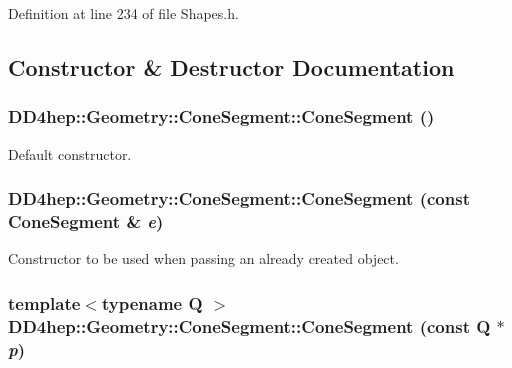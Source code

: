 Definition at line 234 of file Shapes.h.

\subsection{Constructor \& Destructor Documentation}
\hypertarget{class_d_d4hep_1_1_geometry_1_1_cone_segment_a066f3dc238069de0c9bd9d914218229a}{
\subsubsection[{ConeSegment}]{\setlength{\rightskip}{0pt plus 5cm}DD4hep::Geometry::ConeSegment::ConeSegment ()}}
\label{class_d_d4hep_1_1_geometry_1_1_cone_segment_a066f3dc238069de0c9bd9d914218229a}


Default constructor. \hypertarget{class_d_d4hep_1_1_geometry_1_1_cone_segment_a4b394ee203efc33e4ae6fa85bee189c3}{
\subsubsection[{ConeSegment}]{\setlength{\rightskip}{0pt plus 5cm}DD4hep::Geometry::ConeSegment::ConeSegment (const {\bf ConeSegment} \& {\em e})}}
\label{class_d_d4hep_1_1_geometry_1_1_cone_segment_a4b394ee203efc33e4ae6fa85bee189c3}


Constructor to be used when passing an already created object. \hypertarget{class_d_d4hep_1_1_geometry_1_1_cone_segment_a423c53f5a59d8873e4c60a99df0834e7}{
\subsubsection[{ConeSegment}]{\setlength{\rightskip}{0pt plus 5cm}template$<$typename Q $>$ DD4hep::Geometry::ConeSegment::ConeSegment (const Q $\ast$ {\em p})}}
\label{class_d_d4hep_1_1_geometry_1_1_cone_segment_a423c53f5a59d8873e4c60a99df0834e7}


